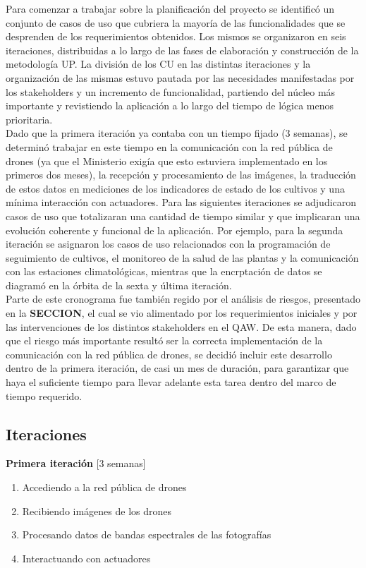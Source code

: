 Para comenzar a trabajar sobre la planificación del proyecto se identificó un conjunto de casos de uso que cubriera la mayoría de las funcionalidades que se desprenden de los requerimientos obtenidos. Los mismos se organizaron en seis iteraciones, distribuidas a lo largo de las fases de elaboración y construcción de la metodología UP. La división de los CU en las distintas iteraciones y la organización de las mismas estuvo pautada por las necesidades manifestadas por los stakeholders y un incremento de funcionalidad, partiendo del núcleo más importante y revistiendo la aplicación a lo largo del tiempo de lógica menos prioritaria.\\
\indent Dado que la primera iteración ya contaba con un tiempo fijado (3 semanas), se determinó trabajar en este tiempo en la comunicación con la red pública de drones (ya que el Ministerio exigía que esto estuviera implementado en los primeros dos meses), la recepción y procesamiento de las imágenes, la traducción de estos datos en mediciones de los indicadores de estado de los cultivos y una mínima interacción con actuadores. Para las siguientes iteraciones se adjudicaron casos de uso que totalizaran una cantidad de tiempo similar y que implicaran una evolución coherente y funcional de la aplicación. Por ejemplo, para la segunda iteración se asignaron los casos de uso relacionados con la programación de seguimiento de cultivos, el monitoreo de la salud de las plantas y la comunicación con las estaciones climatológicas, mientras que la encrptación de datos se diagramó en la órbita de la sexta y última iteración.\\
\indent Parte de este cronograma fue también regido por el análisis de riesgos, presentado en la \textbf{SECCION}, el cual se vio alimentado por los requerimientos iniciales y por las intervenciones de los distintos stakeholders en el QAW. De esta manera, dado que el riesgo más importante resultó ser la correcta implementación de la comunicación con la red pública de drones, se decidió incluir este desarrollo dentro de la primera iteración, de casi un mes de duración, para garantizar que haya el suficiente tiempo para llevar adelante esta tarea dentro del marco de tiempo requerido.

\clearpage

\subsection{Iteraciones}

\textbf{Primera iteración} [3 semanas]
	\begin{enumerate}
		\item Accediendo a la red pública de drones
		\item Recibiendo imágenes de los drones
		\item Procesando datos de bandas espectrales de las fotografías
		\item Interactuando con actuadores
	\end{enumerate}

